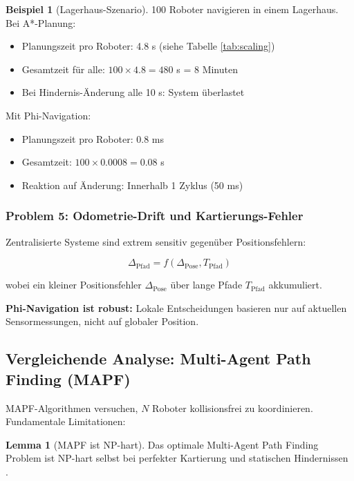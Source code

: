 ﻿\documentclass[a4paper,12pt]{article}
\theoremstyle{definition}
\newtheorem{beispiel}{Beispiel}
\newtheorem{lemma}{Lemma}
\begin{document}
\begin{beispiel}[Lagerhaus-Szenario]
	100 Roboter navigieren in einem Lagerhaus. Bei A*-Planung:
	\begin{itemize}
		\item Planungszeit pro Roboter: 4.8 s (siehe Tabelle \ref{tab:scaling})
		\item Gesamtzeit für alle: $100 \times 4.8 = 480$ s = 8 Minuten
		\item Bei Hindernis-Änderung alle 10 s: System überlastet
	\end{itemize}
	
	Mit Phi-Navigation:
	\begin{itemize}
		\item Planungszeit pro Roboter: 0.8 ms
		\item Gesamtzeit: $100 \times 0.0008 = 0.08$ s
		\item Reaktion auf Änderung: Innerhalb 1 Zyklus (50 ms)
	\end{itemize}
\end{beispiel}

\subsubsection{Problem 5: Odometrie-Drift und Kartierungs-Fehler}

Zentralisierte Systeme sind extrem sensitiv gegenüber Positionsfehlern:

\begin{equation}
\Delta_{\text{Pfad}} = f(\Delta_{\text{Pose}}, T_{\text{Pfad}})
\end{equation}

wobei ein kleiner Positionsfehler $\Delta_{\text{Pose}}$ über lange Pfade $T_{\text{Pfad}}$ akkumuliert.

\textbf{Phi-Navigation ist robust:} Lokale Entscheidungen basieren nur auf aktuellen Sensormessungen, nicht auf globaler Position.

\subsection{Vergleichende Analyse: Multi-Agent Path Finding (MAPF)}

MAPF-Algorithmen versuchen, $N$ Roboter kollisionsfrei zu koordinieren. Fundamentale Limitationen:

\begin{lemma}[MAPF ist NP-hart]
	Das optimale Multi-Agent Path Finding Problem ist NP-hart selbst bei perfekter Kartierung und statischen Hindernissen \cite{lavalle}.
\end{lemma}
\end{document}
